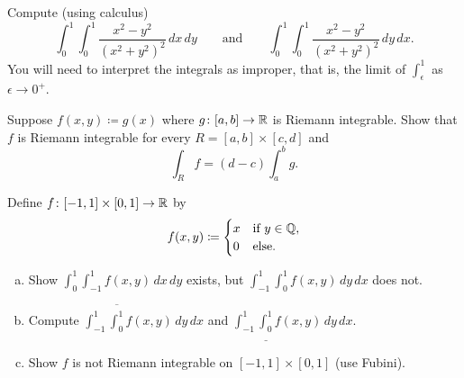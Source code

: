\begin{exercise}
Compute (using calculus)
\begin{equation*}
\int_0^1 \int_0^1 \frac{x^2-y^2}{{(x^2+y^2)}^2} \, dx \, dy
\qquad \text{and} \qquad
\int_0^1 \int_0^1 \frac{x^2-y^2}{{(x^2+y^2)}^2} \, dy \, dx .
\end{equation*}
You will need to interpret the integrals as improper, that
is, the limit of $\int_\epsilon^1$ as $\epsilon \to 0^+$.
\end{exercise}

\begin{exercise}
Suppose $f(x,y) \coloneqq g(x)$ where $g \colon [a,b] \to {\mathbb{R}}$ is Riemann integrable.
Show that $f$ is Riemann integrable for every $R = [a,b] \times [c,d]$ and 
\begin{equation*}
\int_R f = (d-c) \int_a^b g .
\end{equation*}
\end{exercise}

\begin{exercise}
Define $f \colon [-1,1] \times [0,1] \to {\mathbb{R}}$ by
\begin{equation*}
f(x,y) \coloneqq
\begin{cases}
x & \text{if } y \in {\mathbb{Q}}, \\
0 & \text{else.} 
\end{cases}
\end{equation*}
\begin{enumerate}[a)]
\item
Show
$\int_0^1 \int_{-1}^1 f(x,y) \, dx \, dy$ exists, but
$\int_{-1}^1 \int_0^1 f(x,y) \, dy \, dx$ does not.
\item
Compute
$\int_{-1}^1 \overline{\int_0^1} f(x,y) \, dy \, dx$ and
$\int_{-1}^1 \underline{\int_0^1} f(x,y) \, dy \, dx$.
\item
Show $f$ is not Riemann integrable on $[-1,1] \times [0,1]$ (use
Fubini).
\end{enumerate}
\end{exercise}

